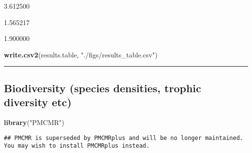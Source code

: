 \documentclass[]{article}
\newenvironment{Shaded}{\begin{snugshade}}{\end{snugshade}}
\newcommand{\KeywordTok}[1]{\textcolor[rgb]{0.13,0.29,0.53}{\textbf{#1}}}
\newcommand{\StringTok}[1]{\textcolor[rgb]{0.31,0.60,0.02}{#1}}
\newcommand{\NormalTok}[1]{#1}
\begin{document}
3.612500

1.565217

1.900000

\begin{Shaded}
\begin{Highlighting}[]
\KeywordTok{write.csv2}\NormalTok{(results.table, }\StringTok{"./figs/results_table.csv"}\NormalTok{)}
\end{Highlighting}
\end{Shaded}

\begin{center}\rule{0.5\linewidth}{\linethickness}\end{center}

\subsection{Biodiversity (species densities, trophic diversity
etc)}\label{biodiversity-species-densities-trophic-diversity-etc}

\begin{Shaded}
\begin{Highlighting}[]
\KeywordTok{library}\NormalTok{(}\StringTok{"PMCMR"}\NormalTok{)}
\end{Highlighting}
\end{Shaded}

\begin{verbatim}
## PMCMR is superseded by PMCMRplus and will be no longer maintained. You may wish to install PMCMRplus instead.
\end{verbatim}
\end{document}
